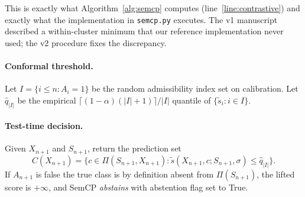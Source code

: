 \smallskip
This is exactly what Algorithm~\ref{alg:semcp} computes (line~\ref{line:contrastive})
and exactly what the implementation in \texttt{semcp.py} executes. The
v1 manuscript described a within-cluster minimum that our reference
implementation never used; the v2 procedure fixes the discrepancy.

\paragraph{Conformal threshold.}
Let $I = \{i \le n : A_i = 1\}$ be the random admissibility index set on
calibration. Let $\hat{q}_{|I|}$ be the empirical
$\lceil (1-\alpha)(|I|+1) \rceil / |I|$ quantile of
$\{\tilde{s}_i : i \in I\}$.

\paragraph{Test-time decision.}
Given $X_{n+1}$ and $S_{n+1}$, return the prediction set
\[
   C(X_{n+1}) = \bigl\{ c \in \Pi(S_{n+1}, X_{n+1}) :
       \tilde{s}(X_{n+1}, c; S_{n+1}, \sigma) \le \hat{q}_{|I|} \bigr\}.
\]
If $A_{n+1}$ is false the true class is by definition absent from
$\Pi(S_{n+1})$, the lifted score is $+\infty$, and SemCP \emph{abstains}
with abstention flag set to True.

%

